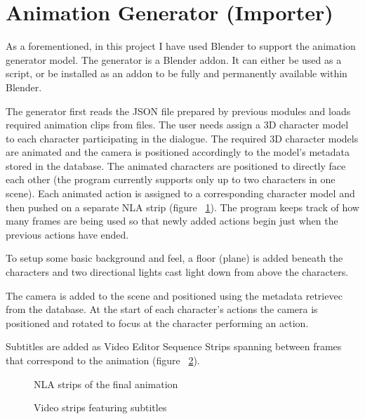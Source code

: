 \section{Animation Generator (Importer)}

As a forementioned, in this project I have used Blender to support the animation generator model. The generator is a Blender addon.  It can either be used as a script, or be installed as an addon to be fully and permanently available within Blender.

The generator first reads the JSON file prepared by previous modules and loads required animation clips from files. The user needs assign a 3D character model to each character participating in the dialogue. The required 3D character models are animated and the camera is positioned accordingly to the model's metadata stored in the database. The animated characters are positioned to directly face each other (the program currently supports only up to two characters in one scene). Each animated action is assigned to a corresponding character model and then pushed on a separate NLA strip (figure ~\ref{fig:nla}). The program keeps track of how many frames are being used so that newly added actions begin just when the previous actions have ended.

To setup some basic background and feel, a floor (plane) is added beneath the characters and two directional lights cast light down from above the characters.

The camera is added to the scene and positioned using the metadata retrievec from the database. At the start of each character's actions the camera is positioned and rotated to focus at the character performing an action.

Subtitles are added as Video Editor Sequence Strips spanning between frames that correspond to the animation (figure ~\ref{fig:substrips}).

\begin{figure}[!ht]
\centerline{}
\caption{NLA strips of the final animation}\label{fig:nla}
\end{figure}
\begin{figure}[!ht]
\centerline{}
\caption{Video strips featuring subtitles}\label{fig:substrips}
\end{figure}


